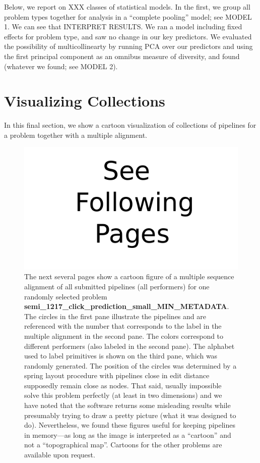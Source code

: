 \documentclass{article}
\begin{document}
Below, we report on XXX classes of statistical models. In the first,
we group all problem types together for analysis in a ``complete
pooling'' model; see MODEL 1. We can see that INTERPRET RESULTS. We
ran a model including fixed effects for problem type, and saw no
change in our key predictors. We evaluated the possibility of
multicollinearty by running PCA over our predictors and using the
first principal component as an omnibus measure of diversity, and
found (whatever we found; see MODEL 2).


\section{Visualizing Collections}
\label{sec:visualization}
In this final section, we show a cartoon visualization of collections
of pipelines for a problem together with a multiple alignment.

\begin{figure}
\centering
\includegraphics{seebelow.pdf}
\caption{The next several pages show a cartoon figure of a multiple
  sequence alignment of all submitted pipelines (all performers) for
  one randomly selected problem {\bf
    semi\_1217\_click\_prediction\_small\_MIN\_METADATA}.  The circles
  in the first pane illustrate the pipelines and are referenced with
  the number that corresponds to the label in the multiple alignment
  in the second pane.  The colors correspond to different performers
  (also labeled in the second pane). The alphabet used to label
  primitives is shown on the third pane, which was randomly generated.
  The position of the circles was determined by a spring layout
  procedure with pipelines close in edit distance supposedly remain
  close as nodes.  That said, usually impossible solve this problem
  perfectly (at least in two dimensions) and we have noted that the
  software returns some misleading results while presumably trying to
  draw a pretty picture (what it was designed to do).  Nevertheless,
  we found these figures useful for keeping pipelines in memory---as
  long as the image is interpreted as a ``cartoon'' and not a
  ``topographical map''.  Cartoons for the other problems are
  available upon request.}
\label{fig:seebelow}
\end{figure}
\end{document}
